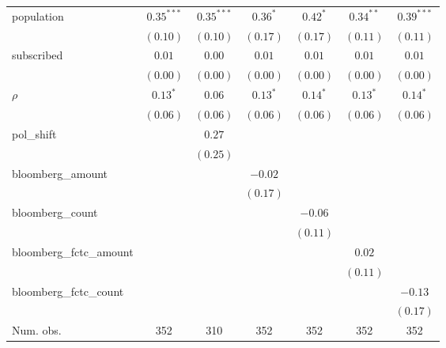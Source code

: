 \begin{table}[!h]
\begin{center}
\begin{tabular}{l c c c c c c }
population              & $0.35^{***}$ & $0.35^{***}$  & $0.36^{*}$   & $0.42^{*}$   & $0.34^{**}$  & $0.39^{***}$ \\
                        & $(0.10)$     & $(0.10)$      & $(0.17)$     & $(0.17)$     & $(0.11)$     & $(0.11)$     \\
subscribed              & $0.01$       & $0.00$        & $0.01$       & $0.01$       & $0.01$       & $0.01$       \\
                        & $(0.00)$     & $(0.00)$      & $(0.00)$     & $(0.00)$     & $(0.00)$     & $(0.00)$     \\
$\rho$                  & $0.13^{*}$   & $0.06$        & $0.13^{*}$   & $0.14^{*}$   & $0.13^{*}$   & $0.14^{*}$   \\
                        & $(0.06)$     & $(0.06)$      & $(0.06)$     & $(0.06)$     & $(0.06)$     & $(0.06)$     \\
pol\_shift              &              & $0.27$        &              &              &              &              \\
                        &              & $(0.25)$      &              &              &              &              \\
bloomberg\_amount       &              &               & $-0.02$      &              &              &              \\
                        &              &               & $(0.17)$     &              &              &              \\
bloomberg\_count        &              &               &              & $-0.06$      &              &              \\
                        &              &               &              & $(0.11)$     &              &              \\
bloomberg\_fctc\_amount &              &               &              &              & $0.02$       &              \\
                        &              &               &              &              & $(0.11)$     &              \\
bloomberg\_fctc\_count  &              &               &              &              &              & $-0.13$      \\
                        &              &               &              &              &              & $(0.17)$     \\
\midrule
Num. obs.               & 352          & 310           & 352          & 352          & 352          & 352          \\

\end{tabular}
\end{center}
\end{table}
